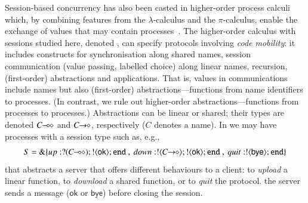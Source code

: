 \documentclass[runningheads]{llncs}
\begin{document}
Session-based concurrency has also been casted in {higher-order} process
calculi which, by combining features from the $\lambda$-calculus and the $\pi$-calculus, 
enable the exchange of values 
that may contain processes~\cite{tlca07,DBLP:journals/jfp/GayV10}. 
The higher-order calculus with sessions studied here, denoted \HOp,
can specify protocols involving \emph{code mobility}: it includes
constructs for 
synchronisation along shared names, 
session communication (value passing, labelled choice) along linear names,
recursion, 
 (first-order) abstractions 
 and applications.
 That is, 
 values in communications include names but also (first-order) abstractions---functions from name identifiers to processes. 
 (In contrast, we rule out higher-order abstractions---functions from processes to processes.)
Abstractions can be linear or shared; their types are  denoted $C\!\! \multimap\!\! \diamond$ and $C\!\! \rightarrow\!\! \diamond$, respectively ($C$ 
denotes a name). In \HOp we may have processes with a 
session type such as, e.g.,
$$S = \btbra{{up}:\btinp{\lhot{C}}\btout{\mathsf{ok}}\tinact ~ , ~ {down}:\btout{\shot{C}}\btout{\mathsf{ok}}\tinact ~ , ~{quit}:\btout{\mathsf{bye}}\tinact}_{}$$
that abstracts a server that offers  different behaviours to a client: 
  to \emph{upload} a linear function, %
  to \emph{download} a shared function, %
   or to \emph{quit} the protocol. 
  the server sends a message ($\mathsf{ok}$ or $\mathsf{bye}$) before closing the session.
\end{document}
